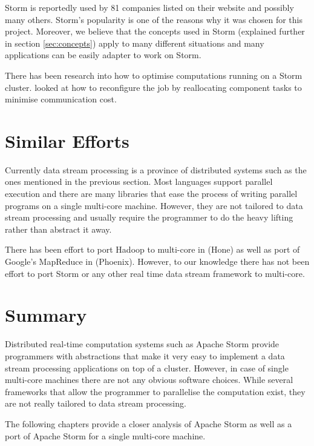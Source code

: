 Storm is reportedly used by 81 companies listed on their website \cite{https://storm.apache.org/documentation/Powered-By.html} and possibly many others. Storm's popularity is one of the reasons why it was chosen for this project. Moreover, we believe that the concepts used in Storm (explained further in section \ref{sec:concepts}) apply to many different situations and many applications can be easily adapter to work on Storm.

There has been research into how to optimise computations running on a Storm cluster. \cite{Chatzistergiou:2014:FHN:2661829.2661882} looked at how to reconfigure the job by reallocating component tasks to minimise communication cost. 

\section{Similar Efforts}
\label{sec:similar_efforts}

Currently data stream processing is a province of distributed systems such as the ones mentioned in the previous section. Most languages support parallel execution and there are many libraries that ease the process of writing parallel programs on a single multi-core machine. However, they are not tailored to data stream processing and usually require the programmer to do the heavy lifting rather than abstract it away.

There has been effort to port Hadoop to multi-core in \citep{Kumar:2013:HSD:2536274.2536314} (Hone) as well as port of Google's MapReduce in \citep{ranger2007evaluating} (Phoenix). However, to our knowledge there has not been effort to port Storm or any other real time data stream framework to multi-core.

\section{Summary}

Distributed real-time computation systems such as Apache Storm provide programmers with abstractions that make it very easy to implement a data stream processing applications on top of  a cluster. However, in case of single multi-core machines there are not any obvious software choices. While several frameworks that allow the programmer to parallelise the computation exist, they are not really tailored to data stream processing.

The following chapters provide a closer analysis of Apache Storm as well as a port of Apache Storm for a single multi-core machine.
